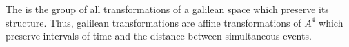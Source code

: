The  is the group of all transformations of a galilean space which preserve its structure. Thus, galilean transformations are affine transformations of $A^4$ which preserve intervals of time and the distance between simultaneous events.
